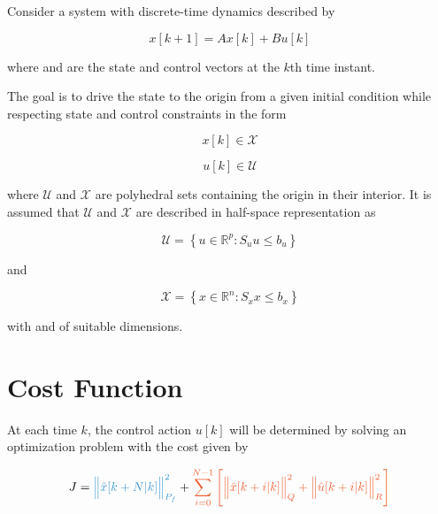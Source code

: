 Consider a system with discrete-time dynamics described by

    \begin{equation}
        x[k + 1] = A x[k] + B u[k]
        \label{eq:cap3:dynamic-equation}
    \end{equation}

\noindent
where  and  are 
the state and control vectors at the $k$th time instant.

The goal is to drive the state  to the origin from a given initial condition while respecting
state and control constraints in the form

\begin{equation}
    \label{eq:cap3:state-constraint-set}
    x[k] \in \mathcal{X}
\end{equation}
    
\begin{equation}
    \label{eq:cap3:input-constraint-set}
    u[k] \in \mathcal{U}
\end{equation}

\noindent
where $\mathcal{U}$ and $\mathcal{X}$ are polyhedral sets containing the origin in their interior.
It is assumed that $\mathcal{U}$ and $\mathcal{X}$ are described in half-space representation as


\begin{equation}
    \mathcal{U} = \left\{
        u \in \mathbb{R}^p : S_u u \leq b_u	
    \right\}
\end{equation}

\noindent
and

\begin{equation}
    \label{eq:cap3:polyhedral-state-constraint}
    \mathcal{X} = \left\{
        x \in \mathbb{R}^n : S_x x \leq b_x
    \right\}
\end{equation}

\noindent
with  and  of suitable dimensions.

\section{Cost Function}


At each time $k$, the control action $u[k]$ will be determined by solving an 
optimization problem with the cost given by


\begin{equation}
    J = \blue{\norma{\hat{x}[k + N | k]}{P_f}} + \orange{\sum^{N-1}_{i=0} \Bigg[ \norma{\hat{x}[k + i | k]}{Q} + \norma{\hat{u}[k + i | k]}{R} \Bigg]}
\end{equation}

